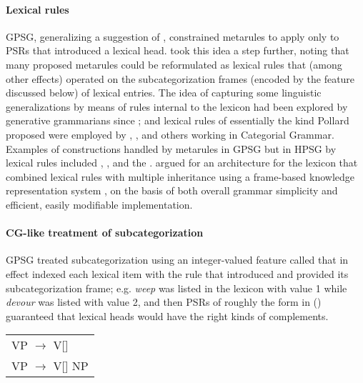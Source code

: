\documentclass[output=paper
 	        ,biblatex
                ,babelshorthands
                ,newtxmath
                ,draftmode
                ,colorlinks, citecolor=brown
]{langscibook}
\begin{document}
\paragraph*{Lexical rules} GPSG, generalizing a suggestion of \citet{Flickinger1983}, constrained metarules to apply only to PSRs that introduced a lexical head. \citet{Pollard85a-u} took this idea a step further, noting that many proposed metarules could be reformulated as lexical rules that (among other effects) operated on the subcategorization frames (encoded by the \subcat feature discussed below) of lexical entries. The idea of capturing some linguistic generalizations by means of rules internal to the lexicon had been explored by generative grammarians since \citet{Jackendoff75a}; and lexical rules of essentially the kind Pollard proposed were employed by \citet{Bach83}, \citet{Dowty78a}, and others working in Categorial Grammar. Examples of constructions handled by metarules in GPSG but in HPSG by lexical rules included , , and the . \citet*{FPW85a} argued for an architecture for the lexicon that combined lexical rules with multiple inheritance using a frame-based knowledge representation system \citep{Minsky1975}, on the basis of both overall grammar simplicity and efficient, easily modifiable implementation.

\paragraph*{CG-like treatment of subcategorization} GPSG\label{page-subcategorization-start} treated subcategorization using an integer-valued feature called \subcat that in effect indexed each lexical item with the rule that introduced and provided its subcategorization frame; e.g. \emph{weep} was listed in the lexicon with \subcat value 1 while \emph{devour} was listed with \subcat value 2, and then PSRs of roughly the form in () guaranteed that lexical heads would have the right kinds of complements.
\ea
\begin{tabular}[t]{l}
          VP $\rightarrow$ V[\subcat 1] \\
          VP $\rightarrow$ V[\subcat 2] NP
\end{tabular}
\z
\end{document}
